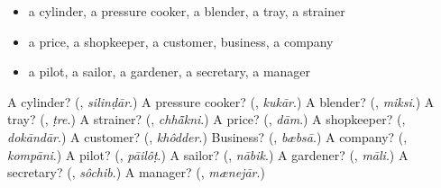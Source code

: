 \begin{itemize}
\raggedright
  \item a cylinder, a pressure cooker, a blender, a tray, a strainer
  \item a price, a shopkeeper, a customer, business, a company
  \item a pilot, a sailor, a gardener, a secretary, a manager
\end{itemize}

\begin{tcolorbox}[breakable,colback=teal!4,colframe=teal!35!black,title={Before you move on}]
A cylinder? (\textbf{}, \emph{silinḍār}.) A pressure cooker? (\textbf{}, \emph{kukār}.) A blender? (\textbf{}, \emph{miksi}.) A tray? (\textbf{}, \emph{ṭre}.) A strainer? (\textbf{}, \emph{chhā̃kni}.) A price? (\textbf{}, \emph{dām}.) A shopkeeper? (\textbf{}, \emph{dokāndār}.) A customer? (\textbf{}, \emph{khôdder}.) Business? (\textbf{}, \emph{bæbsā}.) A company? (\textbf{}, \emph{kompāni}.) A pilot? (\textbf{}, \emph{pāilôṭ}.) A sailor? (\textbf{}, \emph{nābik}.) A gardener? (\textbf{}, \emph{māli}.) A secretary? (\textbf{}, \emph{sôchib}.) A manager? (\textbf{}, \emph{mænejār}.)
\end{tcolorbox}
